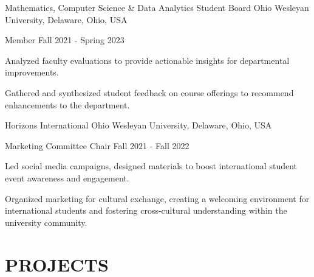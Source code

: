 \documentclass[10pt, letterpaper]{article}
\begin{document}
\begin{leadershipentry}
  {Mathematics, Computer Science \& Data Analytics Student Board} %
  {Ohio Wesleyan University, Delaware, Ohio, USA} %
  \begin{positionentry}
    {Member} %
    {Fall 2021 - Spring 2023} %
    \item Analyzed faculty evaluations to provide actionable insights for departmental improvements.
    \item Gathered and synthesized student feedback on course offerings to recommend enhancements to the department.
  \end{positionentry}
\end{leadershipentry}

\begin{leadershipentry}
  {Horizons International} %
  {Ohio Wesleyan University, Delaware, Ohio, USA} %
  \begin{positionentry}
    {Marketing Committee Chair} %
    {Fall 2021 - Fall 2022} %
    \item Led social media campaigns, designed materials to boost international student event awareness and engagement.
    \item Organized marketing for cultural exchange, creating a welcoming environment for international students and fostering cross-cultural understanding within the university community.
  \end{positionentry}
\end{leadershipentry}

\vspace{\headerSpacing}

\section{PROJECTS}
\end{document}
